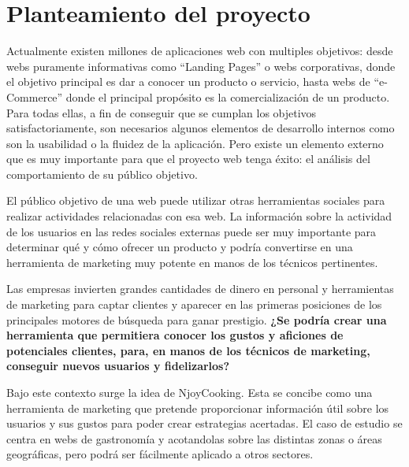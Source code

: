\section{Planteamiento del proyecto}

Actualmente existen millones de aplicaciones web con multiples objetivos: desde webs puramente informativas como ``Landing Pages'' o webs
corporativas, donde el objetivo principal es dar a conocer un producto o servicio, hasta webs de ``e-Commerce'' donde el principal propósito
es la comercialización de un producto. Para todas ellas, a fin de conseguir que se cumplan los objetivos satisfactoriamente, son necesarios algunos
elementos de desarrollo internos como son la usabilidad o la fluidez de la aplicación. Pero existe un elemento externo que es muy importante para que
el proyecto web tenga éxito: el análisis del comportamiento de su público objetivo.

El público objetivo de una web puede utilizar otras herramientas sociales para realizar actividades relacionadas con esa web. La información sobre la actividad de los usuarios en las redes sociales externas puede ser muy importante para determinar qué y cómo ofrecer un producto y podría convertirse en una herramienta de marketing muy potente en manos de los técnicos pertinentes.   

Las empresas invierten grandes cantidades de dinero en personal y herramientas de marketing para captar clientes y aparecer en las primeras posiciones
de los principales motores de búsqueda para ganar prestigio. \textbf{¿Se podría crear una herramienta que
permitiera conocer los gustos y aficiones de potenciales clientes, para, en manos de los técnicos de marketing, conseguir nuevos usuarios y fidelizarlos?}

Bajo este contexto surge la idea de NjoyCooking. Esta se concibe como una herramienta de marketing que pretende proporcionar información útil
sobre los usuarios y sus gustos para poder crear estrategias acertadas. El caso de estudio se centra en webs de gastronomía y acotandolas sobre
las distintas zonas o áreas geográficas, pero podrá ser fácilmente aplicado a otros sectores.
